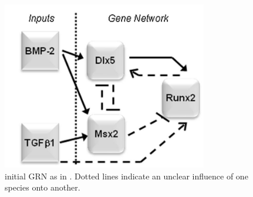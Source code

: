 \documentclass[11pt]{article}
\begin{document}
\begin{figure}[hb]
  \centering
  \includegraphics[width=0.8\textwidth]{regulatory_network.jpg}
  \caption{\label{regulatory_network} initial GRN as in \cite{Kirkham}. Dotted lines indicate an unclear influence of one species onto another.}
\end{figure}

{}

\end{document}
